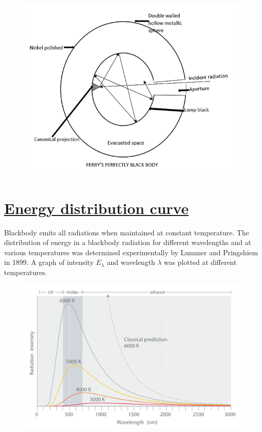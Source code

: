 \documentclass[16pt,a4paper]{article}
\begin{document}
\begin{figure}[H]
	\centering
	\includegraphics[keepaspectratio=true,scale=0.5]{blackbody.png}
\end{figure}


\newpage
\section{\underline{Energy distribution curve}}

Blackbody emits all radiations when maintained at constant temperature. The distribution of energy in a blackbody radiation for different wavelengths and at various temperatures was determined experimentally by Lummer and Pringshiem in 1899. A graph of intensity $E_{\lambda}$ and wavelength $\lambda$ was plotted at different temperatures. 
\begin{figure}[H]
	\centering
	\includegraphics[keepaspectratio=true,scale=0.22]{blackbody_curve.jpg}
\end{figure}
\end{document}
